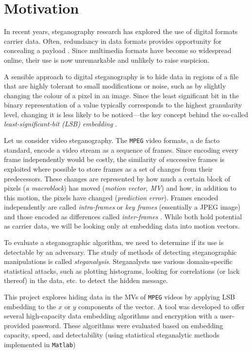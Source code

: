 \documentclass[12pt,british,twoside,notitlepage,usenames,dvipsnames,hypens,final]{report}
\numberwithin{equation}{section}
\numberwithin{figure}{section}
\begin{document}
\section{Motivation}
\label{motivation}

In recent years, steganography research has explored the use of digital formats carrier data. Often, redundancy in data formats provides opportunity for concealing a payload \cite[p. 2]{fridrich}. Since multimedia formats have become so widespread online, their use is now unremarkable and unlikely to raise suspicion.

A sensible approach to digital steganography is to hide data in regions of a file that are highly tolerant to small modifications or noise, such as by slightly changing the colour of a pixel in an image. Since the least significant bit in the binary representation of a value typically corresponds to the highest granularity level, changing it is less likely to be noticed---the key concept behind the so-called \emph{least-significant-bit (LSB) embedding} \cite{bateman}.

Let us consider video steganography. The \texttt{MPEG} video formats, a de facto standard, encode a video stream as a sequence of frames. Since encoding every frame independently would be costly, the similarity of successive frames is exploited where possible to store frames as a set of changes from their predecessors. These changes are represented by how much a certain block of pixels (\emph{a macroblock}) has moved (\emph{motion vector, MV}) and how, in addition to this motion, the pixels have changed (\emph{prediction error}). Frames encoded independently are called \emph{intra-frames} or \emph{key frames} \cite{h264-std} (essentially a JPEG image) and those encoded as differences called \emph{inter-frames} \cite{h264-std}. While both hold potential as carrier data, we will be looking only at embedding data into motion vectors.

To evaluate a steganographic algorithm, we need to determine if its use is detectable by an adversary. The study of methods of detecting steganographic manipulations is called \emph{steganalysis}. Steganalysts use various domain-specific statistical attacks, such as plotting histograms, looking for correlations (or lack thereof) in the data, etc. to detect the hidden message.

This project explores hiding data in the MVs of \texttt{MPEG} videos by applying LSB embedding to the $x$ or $y$ components of the vector. A tool was developed to offer several high-capacity data embedding algorithms and encryption with a user-provided password. These algorithms were evaluated based on embedding capacity, speed, and detectability (using statistical steganalytic methods implemented in \texttt{Matlab}) 
\end{document}
